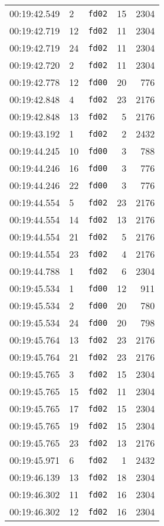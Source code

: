 \documentclass{article}
\begin{document}
\begin{longtable}{lllrr}
00:19:42.549 & 2 & \texttt{fd02} & 15 & 2304 \\
00:19:42.719 & 12 & \texttt{fd02} & 11 & 2304 \\
00:19:42.719 & 24 & \texttt{fd02} & 11 & 2304 \\
00:19:42.720 & 2 & \texttt{fd02} & 11 & 2304 \\
00:19:42.778 & 12 & \texttt{fd00} & 20 & 776 \\
00:19:42.848 & 4 & \texttt{fd02} & 23 & 2176 \\
00:19:42.848 & 13 & \texttt{fd02} & 5 & 2176 \\
00:19:43.192 & 1 & \texttt{fd02} & 2 & 2432 \\
00:19:44.245 & 10 & \texttt{fd00} & 3 & 788 \\
00:19:44.246 & 16 & \texttt{fd00} & 3 & 776 \\
00:19:44.246 & 22 & \texttt{fd00} & 3 & 776 \\
00:19:44.554 & 5 & \texttt{fd02} & 23 & 2176 \\
00:19:44.554 & 14 & \texttt{fd02} & 13 & 2176 \\
00:19:44.554 & 21 & \texttt{fd02} & 5 & 2176 \\
00:19:44.554 & 23 & \texttt{fd02} & 4 & 2176 \\
00:19:44.788 & 1 & \texttt{fd02} & 6 & 2304 \\
00:19:45.534 & 1 & \texttt{fd00} & 12 & 911 \\
00:19:45.534 & 2 & \texttt{fd00} & 20 & 780 \\
00:19:45.534 & 24 & \texttt{fd00} & 20 & 798 \\
00:19:45.764 & 13 & \texttt{fd02} & 23 & 2176 \\
00:19:45.764 & 21 & \texttt{fd02} & 23 & 2176 \\
00:19:45.765 & 3 & \texttt{fd02} & 15 & 2304 \\
00:19:45.765 & 15 & \texttt{fd02} & 11 & 2304 \\
00:19:45.765 & 17 & \texttt{fd02} & 15 & 2304 \\
00:19:45.765 & 19 & \texttt{fd02} & 15 & 2304 \\
00:19:45.765 & 23 & \texttt{fd02} & 13 & 2176 \\
00:19:45.971 & 6 & \texttt{fd02} & 1 & 2432 \\
00:19:46.139 & 13 & \texttt{fd02} & 18 & 2304 \\
00:19:46.302 & 11 & \texttt{fd02} & 16 & 2304 \\
00:19:46.302 & 12 & \texttt{fd02} & 16 & 2304 \\

\end{longtable}
\end{document}
